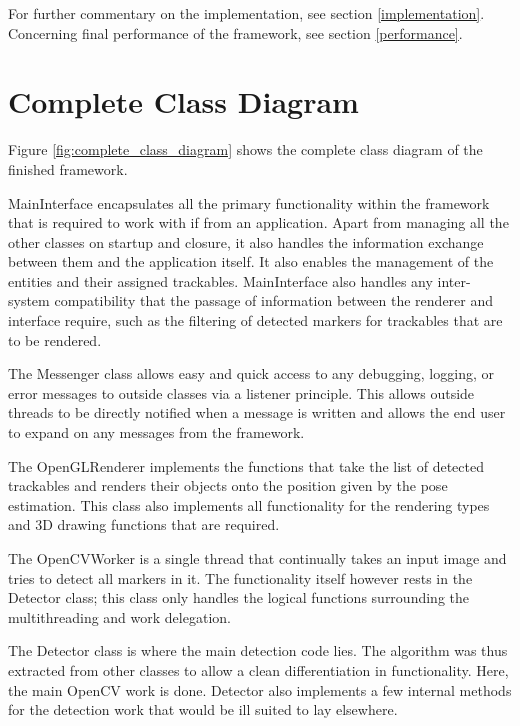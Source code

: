 For further commentary on the implementation, see section \ref{implementation}.
Concerning final performance of the framework, see section \ref{performance}.

\section{Complete Class Diagram}
\label{complete_class}

Figure \ref{fig:complete_class_diagram} shows the complete class diagram of the finished framework.

MainInterface encapsulates all the primary functionality within the framework that is required to work with if from an application.
Apart from managing all the other classes on startup and closure, it also handles the information exchange between them and the application itself.
It also enables the management of the entities and their assigned trackables.
MainInterface also handles any inter-system compatibility that the passage of information between the renderer and interface require, such as the filtering of detected markers for trackables that are to be rendered.

The Messenger class allows easy and quick access to any debugging, logging, or error messages to outside classes via a listener principle.
This allows outside threads to be directly notified when a message is written and allows the end user to expand on any messages from the framework.

The OpenGLRenderer implements the functions that take the list of detected trackables and renders their objects onto the position given by the pose estimation.
This class also implements all functionality for the rendering types and 3D drawing functions that are required.

The OpenCVWorker is a single thread that continually takes an input image and tries to detect all markers in it.
The functionality itself however rests in the Detector class; this class only handles the logical functions surrounding the multithreading and work delegation.

The Detector class is where the main detection code lies.
The algorithm was thus extracted from other classes to allow a clean differentiation in functionality.
Here, the main OpenCV work is done.
Detector also implements a few internal methods for the detection work that would be ill suited to lay elsewhere.

